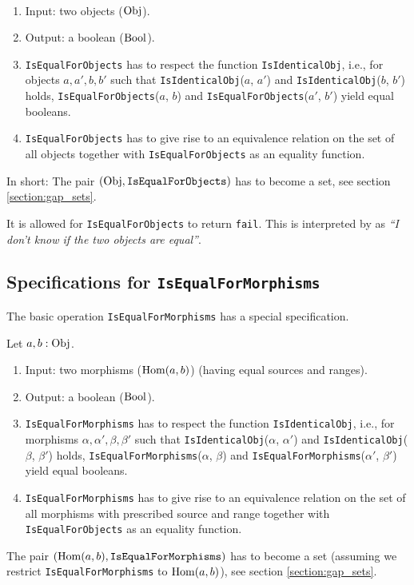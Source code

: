 \begin{specification}
~
 \begin{enumerate}
  \item Input: two objects ($\mathrm{Obj}$).
  \item Output: a boolean ($\mathrm{Bool}$).
  \item \texttt{IsEqualForObjects} has to respect the \GAP function \texttt{IsIdenticalObj}, i.e., 
  for objects $a, a', b, b'$ such that \texttt{IsIdenticalObj}($a$, $a'$) and \texttt{IsIdenticalObj}($b$, $b'$) holds,
  \texttt{IsEqualForObjects}($a$, $b$) and \texttt{IsEqualForObjects}($a'$, $b'$) yield equal booleans.
  \item \texttt{IsEqualForObjects} has to give rise to an equivalence relation on the set of all objects together
  with \texttt{IsEqualForObjects} as an equality function.
 \end{enumerate}
 In short: The pair $( \mathrm{Obj}, \texttt{IsEqualForObjects} )$ has to become a \GAP set, see section \ref{section:gap_sets}.
\end{specification}

\begin{remark}
 It is allowed for \texttt{IsEqualForObjects} to return \texttt{fail}. This is interpreted by \CapPkg as
 \textit{``I don't know if the two objects are equal''}.
\end{remark}

\subsection{Specifications for \texttt{IsEqualForMorphisms}}\label{subsection:specifications_is_equal_for_morphisms}
The basic operation \texttt{IsEqualForMorphisms} has a special specification.

\begin{specification}
Let $a, b: \mathrm{Obj}$. 
 \begin{enumerate}
  \item Input: two morphisms ($\operatorname{\mathrm{Hom}}(a,b)$) (having equal sources and ranges).
  \item Output: a boolean ($\mathrm{Bool}$).
  \item \texttt{IsEqualForMorphisms} has to respect the \GAP function \texttt{IsIdenticalObj}, i.e., 
  for morphisms $\alpha, \alpha', \beta, \beta'$ such that \texttt{IsIdenticalObj}($\alpha$, $\alpha'$) and \texttt{IsIdenticalObj}($\beta$, $\beta'$) holds,
  \texttt{IsEqualForMorphisms}($\alpha$, $\beta$) and \texttt{IsEqualForMorphisms}($\alpha'$, $\beta'$) yield equal booleans.
  \item \texttt{IsEqualForMorphisms} has to give rise to an equivalence relation on the set of all morphisms with prescribed source and range together
  with \texttt{IsEqualForObjects} as an equality function.
 \end{enumerate}
 The pair $( \operatorname{\mathrm{Hom}}(a,b), \texttt{IsEqualForMorphisms} )$ has to become a \GAP set
 (assuming we restrict \texttt{IsEqualForMorphisms} to $\operatorname{\mathrm{Hom}}(a,b)$), see section \ref{section:gap_sets}.
\end{specification}

